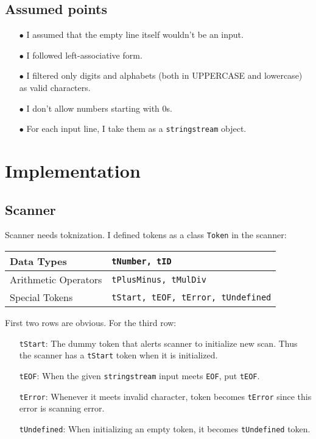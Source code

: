 \documentclass[11pt]{article}
\begin{document}
\subsection{Assumed points} \label{ssec:1.2}
\begin{itemize}
	\item [$\bullet$] I assumed that the empty line itself wouldn't be an input.
	\item [$\bullet$] I followed left-associative form.
	\item [$\bullet$] I filtered only digits and alphabets (both in UPPERCASE and lowercase) as valid characters.
	\item [$\bullet$] I don't allow numbers starting with 0s.
	\item [$\bullet$] For each input line, I take them as a \texttt{stringstream} object.
\end{itemize}

\section{Implementation} \label{sec:2}

\subsection{Scanner} \label{ssec:2.1}
Scanner needs toknization. I defined tokens as a class \texttt{Token} in the scanner:
\begin{center}
\begin{tabular}{|l|l|}
	\hline
	Data Types & \texttt{tNumber, tID} \\ \hline
	Arithmetic Operators & \texttt{tPlusMinus, tMulDiv} \\ \hline
	Special Tokens & \texttt{tStart, tEOF, tError, tUndefined} \\ \hline
\end{tabular}
\end{center}
First two rows are obvious. For the third row:
\begin{itemize}
	\item [\texttt{tStart}:] The dummy token that alerts scanner to initialize new scan. Thus the scanner has a \texttt{tStart} token when it is initialized.
	\item [\texttt{tEOF}:] When the given \texttt{stringstream} input meets \texttt{EOF}, put \texttt{tEOF}.
	\item [\texttt{tError}:] Whenever it meets invalid character, token becomes \texttt{tError} since this error is scanning error.
	\item [\texttt{tUndefined}:] When initializing an empty token, it becomes \texttt{tUndefined} token.
\end{itemize}
\end{document}
